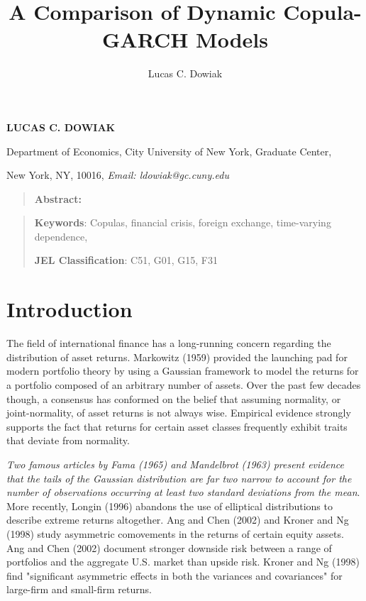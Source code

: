 \documentclass[12pt]{article}
\title{A Comparison of Dynamic Copula-GARCH Models}
\author{Lucas C. Dowiak}
\begin{document}
 
\maketitle{}
 

\textbf{LUCAS C. DOWIAK\medskip}

Department of Economics, City University of New York\smallskip, Graduate
Center,

New York, NY, 10016, \textit{Email: ldowiak@gc.cuny.edu}

\qquad

\begin{quotation}
\textbf{Abstract:}
\end{quotation}

\vspace{1pt}

\begin{quotation}
\textbf{Keywords}: Copulas, financial crisis, foreign exchange, time-varying
dependence,

\textbf{JEL Classification}: C51, G01, G15, F31
\end{quotation}

\vspace{1pt}

\section{Introduction}

The field of international finance has a long-running concern regarding the
distribution of asset returns. Markowitz (1959) provided the launching pad
for modern portfolio theory by using a Gaussian framework to model the returns
for a portfolio composed of an arbitrary number of assets. Over the past few
decades though, a consensus has conformed on the belief that assuming
normality, or joint-normality, of asset returns is not always wise. Empirical
evidence strongly supports the fact that returns for certain asset classes
frequently exhibit traits that deviate from normality.

\emph{Two famous articles by Fama (1965) and Mandelbrot (1963) present
evidence that the tails of the Gaussian distribution are far two narrow to
account for the number of observations occurring at least two standard
deviations from the mean}. More recently, Longin (1996) abandons the use of
elliptical distributions to describe extreme returns altogether. Ang and Chen
(2002) and Kroner and Ng (1998) study asymmetric comovements in the returns of
certain equity assets. Ang and Chen (2002) document stronger downside risk
between a range of portfolios and the aggregate U.S. market than upside risk.
Kroner and Ng (1998) find "significant asymmetric effects in both the
variances and covariances" for large-firm and small-firm returns.
\end{document}
